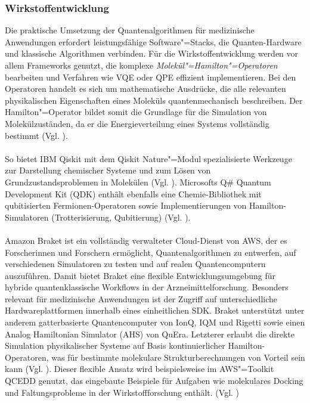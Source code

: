 \subsubsection*{Wirkstoffentwicklung}
Die praktische Umsetzung der Quantenalgorithmen für medizinische Anwendungen erfordert leistungsfähige Software"=Stacks, die Quanten-Hardware und klassische Algorithmen verbinden. Für die Wirkstoffentwicklung werden vor allem Frameworks genutzt, die komplexe \textit{Molekül"=Hamilton"=Operatoren} bearbeiten und Verfahren wie VQE oder QPE effizient implementieren. Bei den Operatoren handelt es sich um mathematische Ausdrücke, die alle relevanten physikalischen Eigenschaften eines Moleküls quantenmechanisch beschreiben. Der Hamilton"=Operator bildet somit die Grundlage für die Simulation von Molekülzuständen, da er die Energieverteilung eines Systems vollständig bestimmt (Vgl. \cite{mcardle_quantum_2020}).\\
\\
So bietet IBM Qiskit mit dem Qiskit Nature"=Modul spezialisierte Werkzeuge zur Darstellung chemischer Systeme und zum Lösen von Grundzustandsproblemen in Molekülen (Vgl. \cite{developers_qiskit_2023}). Microsofts Q\# Quantum Development Kit (QDK) enthält ebenfalls eine Chemie-Bibliothek mit qubitisierten Fermionen-Operatoren sowie Implementierungen von Hamilton-Simulatoren (Trotterisierung, Qubitierung) (Vgl. \cite{team_simulating_2018}). \\
\\
Amazon Braket ist ein vollständig verwalteter Cloud-Dienst von AWS, der es Forscherinnen und Forschern ermöglicht, Quantenalgorithmen zu entwerfen, auf verschiedenen Simulatoren zu testen und auf realen Quantencomputern auszuführen. Damit bietet Braket eine flexible Entwicklungsumgebung für hybride quantenklassische Workflows in der Arzneimittelforschung. Besonders relevant für medizinische Anwendungen ist der Zugriff auf unterschiedliche Hardwareplattformen innerhalb eines einheitlichen SDK. Braket unterstützt unter anderem gatterbasierte Quantencomputer von IonQ, IQM und Rigetti sowie einen Analog Hamiltonian Simulator (AHS) von QuEra. Letzterer erlaubt die direkte Simulation physikalischer Systeme auf Basis kontinuierlicher Hamilton-Operatoren, was für bestimmte molekulare Strukturberechnungen von Vorteil sein kann (Vgl. \cite{noauthor_quantum_nodate-1}). Dieser flexible Ansatz wird beispielsweise im AWS"=Toolkit QCEDD genutzt, das eingebaute Beispiele für Aufgaben wie molekulares Docking und Faltungsprobleme in der Wirkstoffforschung enthält. (Vgl. \cite{noauthor_quantum_nodate})\\ %

